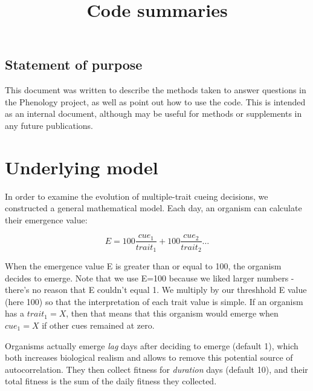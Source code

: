 \documentclass[10pt,a4paper]{article}
\title{Code summaries}
\begin{document}
\maketitle
\subsection{Statement of purpose}
This document was written to describe the methods taken to answer questions in the Phenology project, as well as point out how to use the code. This is intended as an internal document, although may be useful for methods or supplements in any future publications.

\section{Underlying model}

In order to examine the evolution of multiple-trait cueing decisions, we constructed a general mathematical model. Each day, an organism can calculate their emergence value:

\[
E=100\frac{cue_1}{trait_1}+100\frac{cue_2}{trait_2}\dots
\]

When the emergence value E is greater than or equal to 100, the organism decides to emerge. Note that we use E=100 because we liked larger numbers - there's no reason that E couldn't equal 1. We multiply by our threshhold E value (here 100) so that the interpretation of each trait value is simple. If an organism has a $trait_1=X$, then that means that this organism would emerge when $cue_1=X$ if other cues remained at zero. 

Organisms actually emerge \textit{lag} days after deciding to emerge (default 1), which both increases biological realism and allows to remove this potential source of autocorrelation. They then collect fitness for \textit{duration} days (default 10), and their total fitness is the sum of the daily fitness they collected. 
\end{document}
